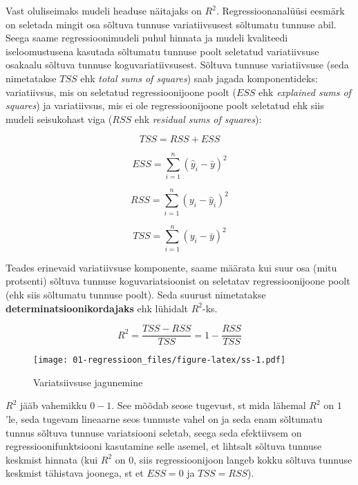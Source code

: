 \documentclass[
]{book}
\begin{document}
Vast oluliseimaks mudeli headuse näitajaks on \(R^2\). Regressioonanalüüsi eesmärk on seletada mingit osa sõltuva tunnuse variatiivsusest sõltumatu tunnuse abil. Seega saame regressioonimudeli puhul hinnata ja mudeli kvaliteedi iseloomustusena kasutada sõltumatu tunnuse poolt seletatud variatiivsuse osakaalu sõltuva tunnuse koguvariatiivsusest. Sõltuva tunnuse variatiivsuse (seda nimetatakse \(TSS\) ehk \emph{total sums of squares}) saab jagada komponentideks: variatiivsus, mis on seletatud regressioonijoone poolt (\(ESS\) ehk \emph{explained sums of squares}) ja variatiivsus, mis ei ole regressioonijoone poolt seletatud ehk siis mudeli seisukohast viga (\(RSS\) ehk \emph{residual sums of squares}):

\[TSS=RSS+ESS\]

\begin{equation}
  ESS=\sum_{i=1}^{n}(\hat{y}_i-\bar{y})^2
\end{equation}

\begin{equation}
  RSS=\sum_{i=1}^{n}(y_i-\hat{y}_i)^2
\end{equation}

\begin{equation}
  TSS=\sum_{i=1}^{n}(y_i-\bar{y})^2
\end{equation}

Teades erinevaid variatiivsuse komponente, saame määrata kui suur osa (mitu protsenti) sõltuva tunnuse koguvariatsioonist on seletatav regressioonijoone poolt (ehk siis sõltumatu tunnuse poolt). Seda suurust nimetatakse \textbf{determinatsioonikordajaks} ehk lühidalt \(R^2\)-ks.

\begin{equation}
  R^2=\frac{TSS-RSS}{TSS}=1-\frac{RSS}{TSS}
\end{equation}

\begin{figure}
\centering
\texttt{[image: 01-regressioon\_files/figure-latex/ss-1.pdf]}
\caption{\label{fig:ss}Variatsiivsuse jagunemine}
\end{figure}

\(R^2\) jääb vahemikku \(0-1\). See mõõdab seose tugevust, st mida lähemal \(R^2\) on \(1\)'le, seda tugevam lineaarne seos tunnuste vahel on ja seda enam sõltumatu tunnus sõltuva tunnuse variatsiooni seletab, seega seda efektiivsem on regressioonifunktsiooni kasutamine selle asemel, et lihtsalt sõltuva tunnuse keskmist hinnata (kui \(R^2\) on \(0\), siis regressioonijoon langeb kokku sõltuva tunnuse keskmist tähistava joonega, st et \(ESS=0\) ja \(TSS=RSS\)).
\end{document}
